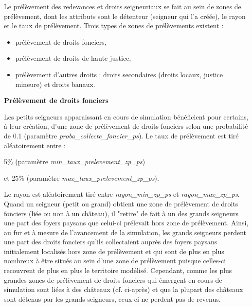 \documentclass[a4paper,11pt]{article}
\begin{document}
{Le prélèvement des redevances et droits seigneuriaux se fait au sein de zones de prélèvement, dont les attributs sont le détenteur (seigneur qui l'a créée), le rayon et le taux de prélèvement. Trois types de zones de prélèvements existent :
\begin{itemize}
  \item prélèvement de droits fonciers,
  \item prélèvement de droits de haute justice,
  \item prélèvement d'autres droits : droits secondaires (droits locaux, justice mineure) et droits banaux.
\end{itemize}

\bigskip
\textbf{Prélèvement de droits fonciers}
\begin{sloppypar}
Les petits seigneurs apparaissant en cours de simulation bénéficient pour certains, à leur création, d'une zone de prélèvement de droits fonciers selon une probabilité de 0.1 (paramètre \textit{proba\_collecte\_foncier\_ps}). Le taux de prélèvement est tiré aléatoirement entre :

5\% (paramètre \textit{min\_taux\_prelevement\_zp\_ps})

et 25\% (paramètre \textit{max\_taux\_prelevement\_zp\_ps}).

Le rayon est aléatoirement tiré entre \textit{rayon\_min\_zp\_ps} et \textit{rayon\_max\_zp\_ps}. Quand un seigneur (petit ou grand) obtient une zone de prélèvement de droits fonciers (liée ou non à un château), il "retire" de fait à un des grands seigneurs une part des foyers paysans que celui-ci prélevait hors zone de prélèvement. Ainsi, au fur et à mesure de l'avancement de la simulation, les grands seigneurs perdent une part des droits fonciers qu'ils collectaient auprès des foyers paysans initialement localisés hors zone de prélèvement et qui sont de plus en plus nombreux à être situés au sein d'une zone de prélèvement puisque celles-ci recouvrent de plus en plus le territoire modélisé. Cependant, comme les plus grandes zones de prélèvement de droits fonciers qui émergent en cours de simulation sont liées à des châteaux (cf. ci-après) et que la plupart des châteaux sont détenus par les grands seigneurs, ceux-ci ne perdent pas de revenus.
\end{sloppypar}


}
\end{document}

